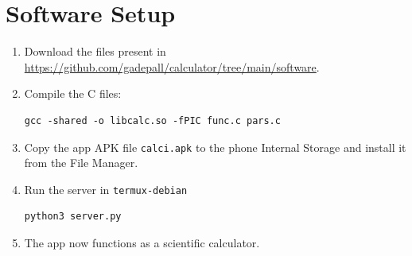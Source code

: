 \documentclass[conference]{IEEEtran}
\begin{document}
\section{Software Setup}
\label{appendix:software}
\begin{enumerate}
  \item Download the files present in \url{https://github.com/gadepall/calculator/tree/main/software}.
  \item Compile the C files:
    \begin{lstlisting}
gcc -shared -o libcalc.so -fPIC func.c pars.c\end{lstlisting}
  \item Copy the app APK file \verb|calci.apk| to the phone Internal Storage and install it from the File Manager.
  \item Run the server in \verb|termux-debian| 
    \begin{lstlisting}
python3 server.py\end{lstlisting}
  \item The app now functions as a scientific calculator.
\end{enumerate}

\iffalse
\subsection{Termux}
\begin{enumerate}
	\item On your android device, follow the instructions in \url{https://github.com/gadepall/fwc-1} to setup and install Debian on Termux.

\end{enumerate}
\fi
\end{document}
